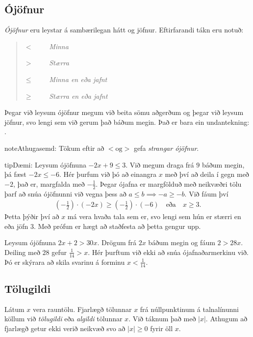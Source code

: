 \documentclass[a4paper,10pt,icelandic]{sphinxmanual}
\begin{document}
\subsection{Ójöfnur}
\label{\detokenize{Kafli02:ojofnur}}
\textit{Ójöfnur} eru leystar á sambærilegan hátt og jöfnur. Eftirfarandi tákn eru notuð:
\begin{quote}

\(< \qquad\)  \textit{Minna}

\(> \qquad\) \textit{Stærra}

\(\leq \qquad\) \textit{Minna en eða jafnt}

\(\geq \qquad\) \textit{Stærra en eða jafnt}
\end{quote}

Þegar við leysum ójöfnur megum við beita sömu aðgerðum og þegar við leysum jöfnur, svo lengi sem við gerum það báðum megin. Það er bara ein undantekning: .

\begin{sphinxadmonition}{note}{Athugasemd:}
Tökum eftir að \(< \text{og} >\) gefa \textit{strangar ójöfnur}.
\end{sphinxadmonition}

\begin{sphinxadmonition}{tip}{Dæmi:}
 Leysum ójöfnuna \(-2x+9 \leq 3\). Við megum draga frá \(9\) báðum megin, þá fæst \(-2x \leq -6\). Hér þurfum við þó að einangra \(x\) með því að deila í gegn með \(-2\), það er, margfalda með \(-\frac{1}{2}\). Þegar ójafna er margfölduð með neikvæðri tölu þarf að snúa ójöfnunni við vegna þess að \(a \leq b \implies -a \geq -b\). Við fáum því
\begin{equation*}
\begin{split}\left(-\frac12\right) \cdot (-2x) \geq \left(-\frac12\right) \cdot (-6) \quad \text{eða} \quad x \geq 3.\end{split}
\end{equation*}
Þetta þýðir því að \(x\) má vera hvaða tala sem er, svo lengi sem hún er stærri en eða jöfn \(3\). Með prófun er hægt að staðfesta að þetta gengur upp.

 Leysum ójöfnuna \(2x+2 >30x\). Drögum frá \(2x\) báðum megin og fáum \(2>28x\). Deiling með \(28\) gefur \(\frac{1}{14}>x\). Hér þurftum við ekki að snúa ójafnaðarmerkinu við. Þó er skýrara að skila svarinu á forminu \(x<\frac{1}{14}\).
\end{sphinxadmonition}


\subsection{Tölugildi}
\label{\detokenize{Kafli02:tolugildi}}
Látum \(x\) vera rauntölu. Fjarlægð tölunnar \(x\) frá núllpunktinum á talnalínunni köllum við \textit{tölugildi} eða \textit{algildi} tölunnar \(x\). Við táknum það með \(|x|\). Athugum að fjarlægð getur ekki verið neikvæð svo að \(|x| \geq 0\) fyrir öll \(x\).
\end{document}
